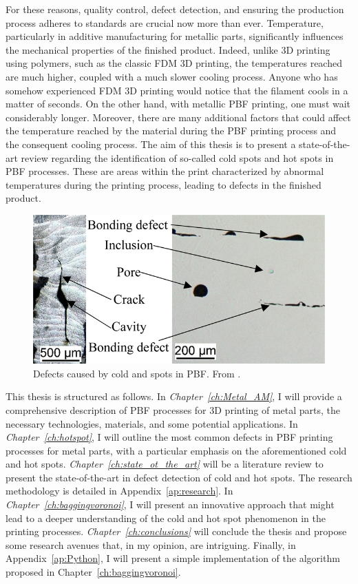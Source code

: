 For these reasons, quality control, defect detection, and ensuring the production process adheres to standards are crucial now more than ever. 
Temperature, particularly in additive manufacturing for metallic parts, significantly influences the mechanical properties of the finished product. Indeed, unlike 3D printing using polymers, such as the classic FDM 3D printing, the temperatures reached are much higher, coupled with a much slower cooling process. Anyone who has somehow experienced FDM 3D printing would notice that the filament cools in a matter of seconds. On the other hand, with metallic PBF printing, one must wait considerably longer. Moreover, there are many additional factors that could affect the temperature reached by the material during the PBF printing process and the consequent cooling process.
The aim of this thesis is to present a state-of-the-art review regarding the identification of so-called cold spots and hot spots in PBF processes. These are areas within the print characterized by abnormal temperatures during the printing process, leading to defects in the finished product.
\begin{figure}[H]
    \centering
    \includegraphics[scale=3.5]{Images/defect.jpeg}
    \caption[Defects in metal AM.]{Defects caused by cold and spots in PBF. From \citeauthor{bernhard_defect_2020}.}
    \label{fig:defect}
\end{figure}

This thesis is structured as follows. In \textit{Chapter~\ref{ch:Metal_AM}}, I will provide a comprehensive description of PBF processes for 3D printing of metal parts, the necessary technologies, materials, and some potential applications. In \textit{Chapter~\ref{ch:hotspot}}, I will outline the most common defects in PBF printing processes for metal parts, with a particular emphasis on the aforementioned cold and hot spots. \textit{Chapter~\ref{ch:state_ot_the_art}} will be a literature review to present the state-of-the-art in defect detection of cold and hot spots. The research methodology is detailed in Appendix~\ref{ap:research}. In \textit{Chapter~\ref{ch:baggingvoronoi}}, I will present an innovative approach that might lead to a deeper understanding of the cold and hot spot phenomenon in the printing processes. \textit{Chapter~\ref{ch:conclusions}} will conclude the thesis and propose some research avenues that, in my opinion, are intriguing. Finally, in Appendix~\ref{ap:Python}, I will present a simple implementation of the algorithm proposed in Chapter~\ref{ch:baggingvoronoi}.